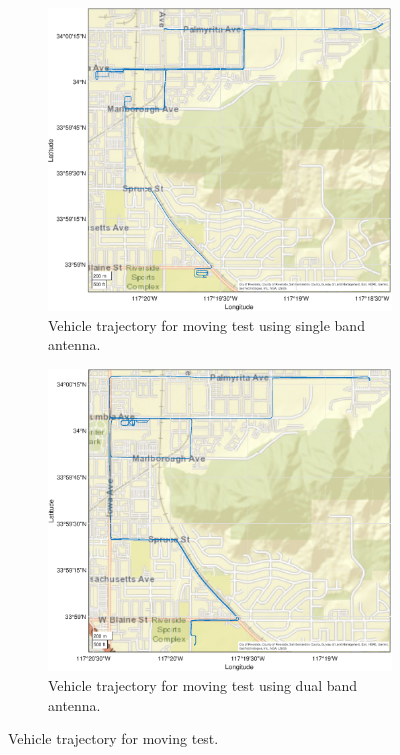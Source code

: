 \documentclass[letterpaper, 10 pt,onecolumn]{article}
\begin{document}
	\begin{figure}[H]
		\centering
		\begin{subfigure}{.5\textwidth}
			\includegraphics[width=\linewidth]{figures/trajectory_single.eps}
			\caption{Vehicle trajectory for moving test using single band antenna.}
			\label{fig:trj_mt1}
		\end{subfigure}%
		\begin{subfigure}{.5\textwidth}
			\includegraphics[width=\linewidth]{figures/trajectory_dual.eps}
			\caption{Vehicle trajectory for moving test using dual band antenna.}
			\label{fig:trj_mt2}
		\end{subfigure}
		\caption[short]{Vehicle trajectory for moving test.}
		\label{fig:trj}
	\end{figure}
	
\end{document}
